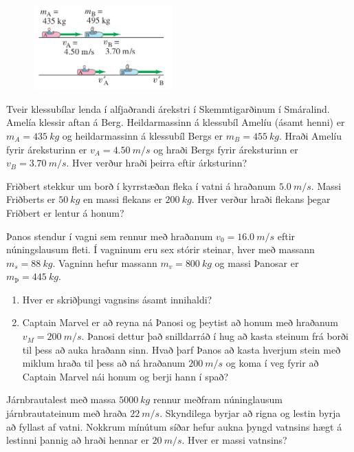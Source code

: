 \begin{enumerate}[label = \textbf{Dæmi \thechapter.\arabic*.}]
\begin{minipage}{\linewidth}

\begin{figure}
\centering
\vspace{-1cm}
\includegraphics[width=2.1in]{images/bumber.png}
    \label{fig:bumper}
\end{figure}

\item Tveir klessubílar lenda í alfjaðrandi árekstri í Skemmtigarðinum í Smáralind. Amelía klessir aftan á Berg. Heildarmassinn á klessubíl Amelíu (ásamt henni) er $m_A = \SI{435}{kg}$ og heildarmassinn á klessubíl Bergs er $m_B = \SI{455}{kg}$. Hraði Amelíu fyrir áreksturinn er $v_A = \SI{4.50}{m/s}$ og hraði Bergs fyrir áreksturinn er $v_B = \SI{3.70}{m/s}$. Hver verður hraði þeirra eftir árksturinn? 
\end{minipage}

\item Friðbert stekkur um borð í kyrrstæðan fleka í vatni á hraðanum $\SI{5.0}{m/s}$. Massi Friðberts er $\SI{50}{kg}$ en massi flekans er $\SI{200}{kg}$. Hver verður hraði flekans þegar Friðbert er lentur á honum?

\item Þanos stendur í vagni sem rennur með hraðanum $v_0 = \SI{16.0}{m/s}$ eftir núningslausum fleti. Í vagninum eru sex stórir steinar, hver með massann $m_{s}=\SI{88}{kg}$. Vagninn hefur massann $m_{v}=\SI{800}{kg}$ og massi Þanosar er $m_{\text{Þ}}=\SI{445}{kg}$.
\begin{enumerate}[label = \textbf{(\alph*)}]
    \item Hver er skriðþungi vagnsins ásamt innihaldi?
    \item Captain Marvel er að reyna ná Þanosi og þeytist að honum með hraðanum $v_{M}= \SI{200}{m/s}$. Þanosi dettur það snilldarráð í hug að kasta steinum frá borði til þess að auka hraðann sinn. Hvað þarf Þanos að kasta hverjum stein með miklum hraða til þess að ná hraðanum $\SI{200}{m/s}$ og koma í veg fyrir að Captain Marvel nái honum og berji hann í spað?
\end{enumerate}

\item Járnbrautalest með massa $\SI{5000}{kg}$ rennur meðfram núninglausum járnbrautateinum með hraða $\SI{22}{m/s}$. Skyndilega byrjar að rigna og lestin byrja að fyllast af vatni. Nokkrum mínútum síðar hefur aukna þyngd vatnsins hægt á lestinni þannig að hraði hennar er $\SI{20}{m/s}$. Hver er massi vatnsins?


\end{enumerate}
